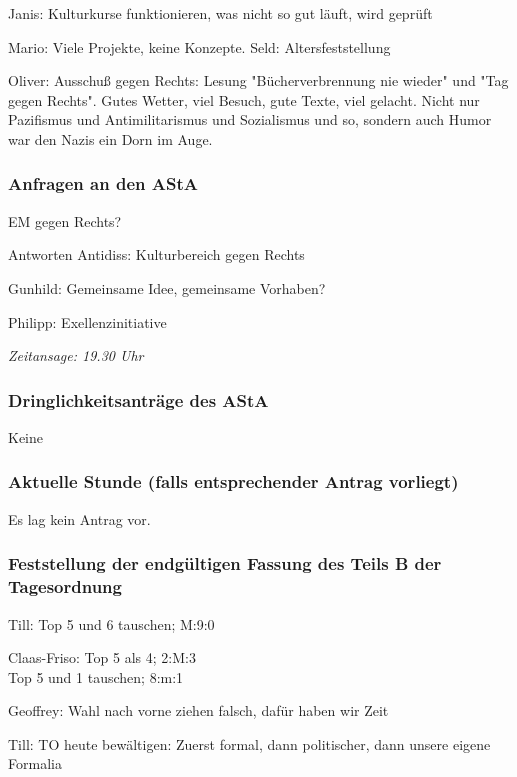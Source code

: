 \documentclass[ngerman,headheight=70pt]{scrartcl}
\begin{document}
    Janis: Kulturkurse funktionieren, was nicht so gut läuft, wird geprüft

    Mario: Viele Projekte, keine Konzepte. Seld: Altersfeststellung

    Oliver: Ausschuß gegen Rechts: Lesung "Bücherverbrennung nie wieder" und
    "Tag gegen Rechts". Gutes Wetter, viel Besuch, gute Texte, viel gelacht.
    Nicht nur Pazifismus und Antimilitarismus und Sozialismus und so, sondern auch
    Humor war den Nazis ein Dorn im Auge.

    \subsubsection{Anfragen an den AStA}

    EM gegen Rechts?

    Antworten Antidiss: Kulturbereich gegen Rechts

    Gunhild: Gemeinsame Idee, gemeinsame Vorhaben?

    Philipp: Exellenzinitiative

    \textit{Zeitansage: 19.30 Uhr}

    \subsubsection{Dringlichkeitsanträge des AStA}

    Keine

    \subsubsection{Aktuelle Stunde (falls entsprechender Antrag vorliegt)}

    Es lag kein Antrag vor.

    \subsubsection{Feststellung der endgültigen Fassung des Teils B der Tagesordnung}

    Till: Top 5 und 6 tauschen; M:9:0

    Claas-Friso: Top 5 als 4; 2:M:3 \\
                 Top 5 und 1 tauschen; 8:m:1

    Geoffrey: Wahl nach vorne ziehen falsch, dafür haben wir Zeit

    Till: TO heute bewältigen: Zuerst formal, dann politischer, dann unsere eigene Formalia
\end{document}
